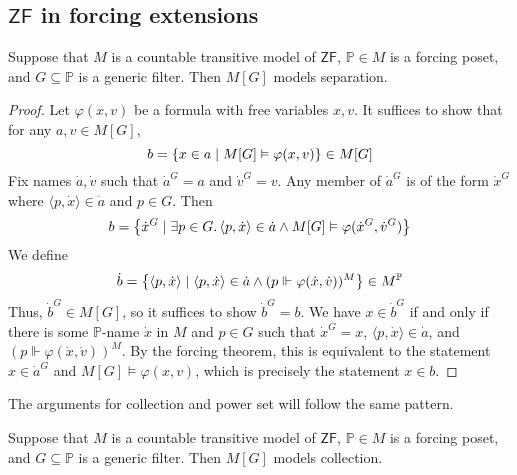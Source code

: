 \subsection{\texorpdfstring{\( \mathsf{ZF} \)}{ZF} in forcing extensions}
\begin{lemma}
    Suppose that \( M \) is a countable transitive model of \( \mathsf{ZF} \), \( \mathbb P \in M \) is a forcing poset, and \( G \subseteq \mathbb P \) is a generic filter.
    Then \( M[G] \) models separation.
\end{lemma}
\begin{proof}
    Let \( \varphi(x, v) \) be a formula with free variables \( x, v \).
    It suffices to show that for any \( a, v \in M[G] \),
    \[ b = \qty{x \in a \mid M[G] \vDash \varphi(x, v)} \in M[G] \]
    Fix names \( \dot a, \dot v \) such that \( \dot a^G = a \) and \( \dot v^G = v \).
    Any member of \( \dot a^G \) is of the form \( \dot x^G \) where \( \langle p, \dot x \rangle \in \dot a \) and \( p \in G \).
    Then
    \[ b = \qty{\dot x^G \mid \exists p \in G.\, \langle p, \dot x \rangle \in \dot a \wedge M[G] \vDash \varphi(\dot x^G, \dot v^G)} \]
    We define
    \[ \dot b = \qty{\langle p, \dot x \rangle \mid \langle p, \dot x \rangle \in \dot a \wedge (p \Vdash \varphi(\dot x, \dot v))^M} \in M^{\mathbb P} \]
    Thus, \( \dot b^G \in M[G] \), so it suffices to show \( \dot b^G = b \).
    We have \( x \in \dot b^G \) if and only if there is some \( \mathbb P \)-name \( \dot x \) in \( M \) and \( p \in G \) such that \( \dot x^G = x \), \( \langle p, \dot x \rangle \in \dot a \), and \( (p \Vdash \varphi(\dot x, \dot v))^M \).
    By the forcing theorem, this is equivalent to the statement \( x \in \dot a^G \) and \( M[G] \vDash \varphi(x, v) \), which is precisely the statement \( x \in b \).
\end{proof}
The arguments for collection and power set will follow the same pattern.
\begin{lemma}
    Suppose that \( M \) is a countable transitive model of \( \mathsf{ZF} \), \( \mathbb P \in M \) is a forcing poset, and \( G \subseteq \mathbb P \) is a generic filter.
    Then \( M[G] \) models collection.
\end{lemma}
